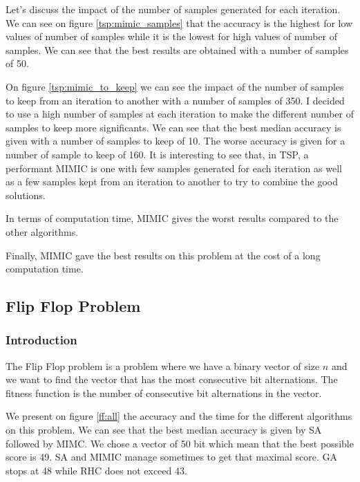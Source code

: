 \documentclass[10pt]{article}
\begin{document}
				Let's discuss the impact of the number of samples generated for each iteration. We can see on figure \ref{tsp:mimic_samples} that the accuracy is the highest for low values of number of samples while it is the lowest for high values of number of samples. We can see that the best results are obtained with a number of samples of 50.

				On figure \ref{tsp:mimic_to_keep} we can see the impact of the number of samples to keep from an iteration to another with a number of samples of 350. I decided to use a high number of samples at each iteration to make the different number of samples to keep more significants. We can see that the best median accuracy is given with a number of samples to keep of 10. The worse accuracy is given for a number of sample to keep of 160. It is interesting to see that, in TSP, a performant MIMIC is one with few samples generated for each iteration as well as a few samples kept from an iteration to another to try to combine the good solutions.

				In terms of computation time, MIMIC gives the worst results compared to the other algorithms.

				Finally, MIMIC gave the best results on this problem at the cost of a long computation time.
		\subsection{Flip Flop Problem}
			\subsubsection*{Introduction}
				The Flip Flop problem is a problem where we have a binary vector of size $n$ and we want to find the vector that has the most consecutive bit alternations. The fitness function is the number of consecutive bit alternations in the vector.

				We present on figure \ref{ff:all} the accuracy and the time for the different algorithms on this problem. We can see that the best median accuracy is given by SA followed by MIMC. We chose a vector of 50 bit which mean that the best possible score is 49. SA and MIMIC manage sometimes to get that maximal score. GA stops at 48 while RHC does not exceed 43.
\end{document}
